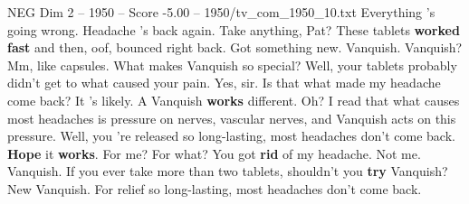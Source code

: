 \begin{textsample}{NEG Dim 2 – 1950 – Score -5.00 – 1950/tv\_com\_1950\_10.txt}  \label{ex:f2_neg_082}
Everything 's going wrong.
Headache 's back again.
Take anything, Pat?
These tablets \textbf{worked} \textbf{fast} and then, oof, bounced right back.
Got something new.
Vanquish.
Vanquish?
Mm, like capsules.
What makes Vanquish so special?
Well, your tablets probably didn't get to what caused your pain.
Yes, sir.
Is that what made my headache come back?
It 's likely.
A Vanquish \textbf{works} different.
Oh?
I read that what causes most headaches is pressure on nerves, vascular nerves, and Vanquish acts on this pressure.
Well, you 're released so long-lasting, most headaches don't come back. \textbf{Hope} it \textbf{works}.
For me?
For what?
You got \textbf{rid} of my headache.
Not me.
Vanquish.
If you ever take more than two tablets, shouldn't you \textbf{try} Vanquish?
New Vanquish.
For relief so long-lasting, most headaches don't come back.

\end{textsample}
